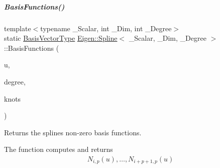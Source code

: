 \mbox{\label{group___splines___module_a038506788499d71aedddc5211c33bb6e}} 
\subparagraph{\texorpdfstring{Basis\+Functions()}{BasisFunctions()}\hspace{0.1cm}{\footnotesize\ttfamily [1/2]}}
{\footnotesize\ttfamily template$<$typename \+\_\+\+Scalar, int \+\_\+\+Dim, int \+\_\+\+Degree$>$ \\
static \hyperlink{group___splines___module_a1d49cef942ea59d85d1711ee32354e6b}{Basis\+Vector\+Type} \hyperlink{group___splines___module_class_eigen_1_1_spline}{Eigen\+::\+Spline}$<$ \+\_\+\+Scalar, \+\_\+\+Dim, \+\_\+\+Degree $>$\+::Basis\+Functions (\begin{DoxyParamCaption}\item[{\hyperlink{group___splines___module_a8cafd78b564825c76fbb3419653d9742}{Scalar}}]{u,  }\item[{Dense\+Index}]{degree,  }\item[{const \hyperlink{group___splines___module_a066f7a8b120316c9068b559f0790e9ec}{Knot\+Vector\+Type} \&}]{knots }\end{DoxyParamCaption})\hspace{0.3cm}{\ttfamily [static]}}



Returns the spline\textquotesingle{}s non-\/zero basis functions. 

The function computes and returns \begin{align*} N_{i,p}(u), \hdots, N_{i+p+1,p}(u) \end{align*}


